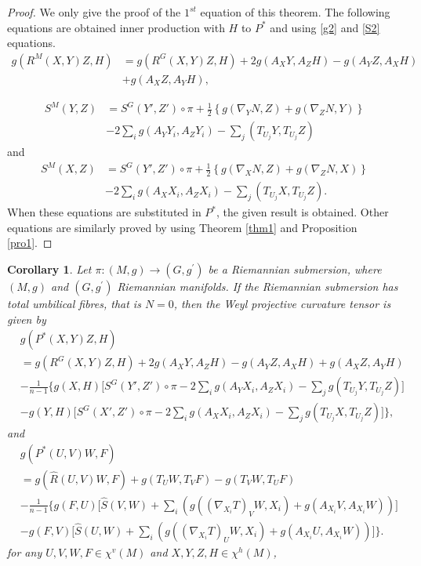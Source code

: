 \documentclass{birkjour}
\newtheorem{corollary}[theorem]{Corollary}
\theoremstyle{definition}
\theoremstyle{remark}
\numberwithin{equation}{section}
\begin{document}
\begin{proof}
	We only give the proof of the $1^{st}$ equation of this theorem. The following equations are obtained inner production with $H$ to $P^*$ and using \eqref{g2} and \eqref{S2} equations.
	\begin{align}
		g(R^M(X,Y)Z,H)&=g(R^G(X,Y)Z,H)+ 2g(A_X Y, A_Z H)- g(A_Y Z,A_X H)\nonumber \\
		&+g(A_X Z, A_Y H),\nonumber 
	\end{align}
	
	\begin{align}
		S^M(Y,Z) &= S^G (Y',Z')  \circ \pi	+ \frac{1}{2} \left\{g(\nabla_Y N,Z)+g(\nabla_Z N, Y)\right\} \nonumber \\
		&-2\sum_{i} g(A_Y Y_i, A_Z Y_i) -\sum_{j}(T_{U_j}Y, T_{U_j}Z)\nonumber 
	\end{align}
	and
	\begin{align}
		S^M(X,Z) &= S^G (Y', Z')  \circ \pi
		+ \frac{1}{2} \left\{g(\nabla_X N,Z)+g(\nabla_Z N, X)\right\} \nonumber\\
		&-2\sum_{i} g(A_X X_i, A_Z X_i) -\sum_{j}(T_{U_j}X, T_{U_j}Z).\nonumber 
	\end{align}
	When these equations are substituted in $P^*$, the given result is obtained. Other equations are similarly proved by using Theorem \ref{thm1} and Proposition \ref{pro1}.
\end{proof}

\begin{corollary}
Let $\pi: (M, g) \to(G, g^\prime)$ be a Riemannian submersion, where $(M, g)$ and $(G, g^\prime)$ Riemannian manifolds. If the Riemannian submersion has total umbilical fibres, that  is $N = 0$,  then the Weyl projective curvature tensor is given by
	\begin{align*}
		&g(P^*(X,Y)Z, H)\\
		&=g(R^G (X,Y) Z , H )+2g (A_{X}Y, A_{Z}H)-g (A_{Y}Z, A_{X}H )+g (A_{X}Z, A_{Y}H )\\
		&- \frac{1}{n-1} \Bigg\{ g(X,H) \bigg[S^G (Y', Z') \circ \pi
		-2 \sum_{i} g(A_Y X_i, A_Z X_i) - \sum_{j} g(T_{U_j}Y, T_{U_j}Z)\bigg] \\
		&- g(Y,H) \bigg[S^G (X', Z') \circ \pi
		-2 \sum_{i} g(A_X X_i, A_Z X_i) - \sum_{j} g(T_{U_j}X, T_{U_j}Z)\bigg] \Bigg\},
	\end{align*}
	and
	\begin{align*}
		&g(P^*(U,V)W, F) \\
		&= g( \hat{R} (U,V)W , F)+ g (T_{U}W, T_{V}F )- g (T_{V}W, T_{U}F) \\
		&- \frac{1}{n-1} \Bigg\{ g(F,U) \bigg[\hat{S} (V, W)
		+  \sum_{i} \left( g((\nabla_{X_i} T)_V W, X_i)+g(A_{X_i} V, A_{X_i} W)\right)\bigg] \\
		&- g(F,V) \bigg[\hat{S} (U, W)
		+  \sum_{i} \left( g((\nabla_{X_i} T)_U W, X_i)+g(A_{X_i} U, A_{X_i} W)\right)\bigg]\Bigg\}.
	\end{align*}
for any $U, V, W, F \in \chi^v (M)$ and $X, Y, Z, H\in  \chi^h (M)$, 
\end{corollary}
\end{document}
